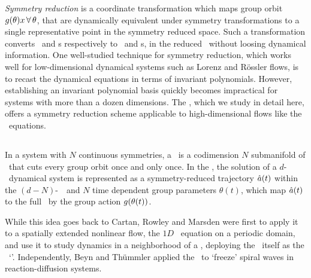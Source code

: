 \emph{Symmetry reduction} is a coordinate transformation which maps
group orbit $g (\theta) x \, \forall \, \theta$, that are
dynamically equivalent under symmetry transformations to a single
representative point in the symmetry reduced space. Such a transformation
converts \reqva\ and \rpo s respectively to \eqva\ and \po s, in the
reduced \statesp\ without loosing dynamical information. One well-studied
technique for symmetry reduction, which works well for low-dimensional
dynamical systems such as Lorenz and R\"{o}ssler flows, is to recast the
dynamical equations in terms of invariant polynomials.
However, establishing an invariant polynomial basis quickly becomes
impractical for systems with more than a dozen
dimensions.
The \mslices%
,
which we study in detail here, offers a symmetry reduction
scheme applicable to high-dimensional flows like the \NS\ equations.

\subsection{\Mslices}
\label{s-slice}

In a system with $N$ continuous symmetries, a \emph{\slice} \pSRed\ is a codimension $N$ submanifold
of \pS\ that cuts every group orbit once and only once. In the \emph{\mslices}, the solution
of a $d$-\dmn\ dynamical system is represented as a symmetry-reduced trajectory $\hat{a} (t)$ within the
$(d-N)$-\dmn\ \slice\ and $N$ time dependent group parameters $\theta(t)$, which
map $\hat{a} (t)$ to the full \statesp\ by the group action $g(\theta(t))$.

While this idea goes back to Cartan,
Rowley and Marsden
were first to apply it to a spatially extended nonlinear flow,
the $1D$ \KS\ equation
on a periodic domain, and use it to study dynamics in a neighborhood of
a \reqv, deploying the \reqv\ itself as the \slice\ `\template'.
Independently, Beyn and Th\"{u}mmler applied
the \mslices\ to `freeze' spiral waves in reaction-diffusion systems.

